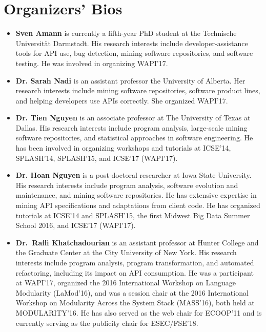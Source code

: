 \documentclass[10pt, conference]{IEEEtran}
\begin{document}
\section{Organizers' Bios}
\begin{itemize}
\setlength\itemsep{5pt}
\item \textbf{Sven Amann} is currently a fifth-year PhD student at the Technische Universit\"{a}t Darmstadt. His research interests include developer-assistance tools for API use, bug detection, mining software repositories, and software testing. He was involved in organizing WAPI'17.

\item \textbf{Dr. Sarah Nadi} is an assistant professor the University of Alberta. Her research interests include mining software repositories, software product lines, and helping developers use APIs correctly. She organized WAPI'17.

\item \textbf{Dr. Tien Nguyen} is an associate professor at The University of Texas at Dallas. His research interests include program analysis, large-scale mining software repositories, and statistical approaches in software engineering. He has been involved in organizing workshops and tutorials at ICSE’14, SPLASH’14, SPLASH’15, and ICSE'17 (WAPI'17).

\item \textbf{Dr. Hoan Nguyen} is a post-doctoral researcher at Iowa State University. His research interests include program analysis, software evolution and maintenance, and mining software repositories. He has extensive expertise in mining API specifications and adaptations from client code. He has organized tutorials at ICSE'14 and SPLASH'15, the first Midwest Big Data Summer School 2016, and ICSE'17 (WAPI'17).

\item \textbf{Dr.~Raffi Khatchadourian} is an assistant professor at Hunter College and the Graduate Center at the City University of New York. His research interests include program analysis, program transformation, and automated refactoring, including its impact on API consumption. He was a participant at WAPI'17, organized the 2016 International Workshop on Language Modularity (LaMod'16), and was a session chair at the 2016 International Workshop on Modularity Across the System Stack (MASS'16), both held at MODULARITY'16. He has also served as the web chair for ECOOP'11 and is currently serving as the publicity chair for ESEC/FSE'18.
\end{itemize}
\end{document}

